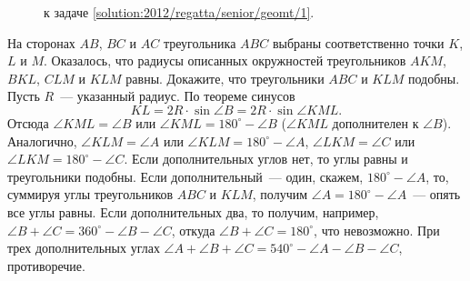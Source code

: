 \ifsolution
\begin{figure}\centering
    \caption{к задаче \ref{solution:2012/regatta/senior/geomt/1}.}
    \label{fig:solution:2012/regatta/senior/geomt/1}
\end{figure}
\fi %

\problem
На сторонах $AB$, $BC$ и $AC$ треугольника $ABC$ выбраны соответственно точки
$K$, $L$ и $M$.
Оказалось, что радиусы описанных окружностей треугольников
$AKM$, $BKL$, $CLM$ и $KLM$ равны.
Докажите, что треугольники $ABC$ и $KLM$ подобны.
\solution
\label{solution:2012/regatta/senior/geomt/1}%
Пусть $R$~--- указанный радиус.
По теореме синусов
\[
    KL = 2 R \cdot \sin \angle B = 2 R \cdot \sin \angle KML
.\]
Отсюда $\angle KML = \angle B$ или $\angle KML = 180^\circ - \angle B$
($\angle KML$ дополнителен к $\angle B$).
Аналогично,
$\angle KLM = \angle A$ или $\angle KLM = 180^\circ - \angle A$,
$\angle LKM = \angle C$ или $\angle LKM = 180^\circ - \angle C$.
Если дополнительных углов нет, то углы равны и треугольники подобны.
Если дополнительный~--- один, скажем, $180^\circ - \angle A$, то,
суммируя углы треугольников $ABC$ и $KLM$, получим
$\angle A = 180^\circ - \angle A$~--- опять все углы равны.
Если дополнительных два, то получим, например,
$\angle B + \angle C = 360^\circ - \angle B - \angle C$,
откуда $\angle B + \angle C = 180^\circ$, что невозможно.
При трех дополнительных углах
$\angle A + \angle B + \angle C = 540^\circ - \angle A - \angle B - \angle C$,
противоречие.
\endproblem
